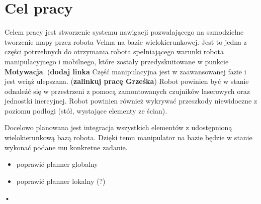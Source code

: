 \chapter{Cel pracy}

Celem pracy jest stworzenie systemu nawigacji pozwalającego na samodzielne tworzenie mapy przez robota Velma na bazie wielokierunkowej.
Jest to jedna z części potrzebnych do otrzymania robota spełniającego warunki robota manipulacyjnego i mobilnego, które zostały przedyskuitowane w punkcie \textbf{Motywacja}. (\textbf{dodaj linka} 
Część manipulacyjna jest w zaawansowanej fazie i jest wciąż ulepszana. (\textbf{zalinkuj pracę Grześka})
Robot powinien być w stanie odnaleźć się w przestrzeni z pomocą zamontowanych czujników laserowych oraz jednostki inercyjnej. 
Robot powinien również wykrywać przeszkody niewidoczne z poziomu podłogi (stół, wystające elementy ze ścian).

Docelowo planowana jest integracja wszystkich elementów z udostępnioną wielokierunkową bazą robota. Dzięki temu manipulator na bazie będzie w stanie wykonać podane mu konkretne zadanie.

	\begin{itemize}
		\item poprawić planner globalny
		\item poprawić planner lokalny (?)
		
	\end{itemize}•